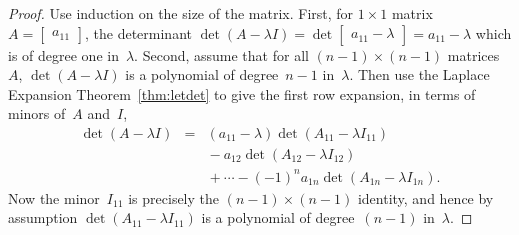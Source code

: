 \begin{proof} 
Use induction on the size of the matrix.
First, for \(1\times 1\) matrix \(A=\begin{bmatrix} a_{11} \end{bmatrix}\), the determinant \(\det(A-\lambda I)=\det \begin{bmatrix} a_{11}-\lambda \end{bmatrix}=a_{11}-\lambda\) which is of  degree one in~\(\lambda\).
Second, assume that for all \((n-1)\times (n-1)\) matrices~\(A\), \(\det(A-\lambda I)\) is a polynomial of degree~\(n-1\) in~\(\lambda\).
Then use the Laplace Expansion Theorem~\ref{thm:letdet} to give the first row expansion, in terms of minors of~\(A\) and~\(I\),
\begin{eqnarray*}
\det(A-\lambda I)
&=&(a_{11}-\lambda)\det (A_{11}-\lambda I_{11})
\\&&{}
-a_{12}\det (A_{12}-\lambda I_{12})
\\&&{}
+\cdots-(-1)^{n}a_{1n}\det (A_{1n}-\lambda I_{1n}).
\end{eqnarray*}
Now the minor~\(I_{11}\) is precisely the \((n-1)\times(n-1)\) identity, and hence by assumption \(\det(A_{11}-\lambda I_{11})\) is a polynomial of degree~\((n-1)\) in~\(\lambda\).

\end{proof}
